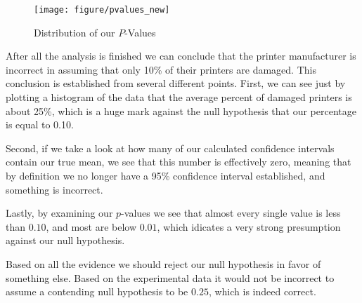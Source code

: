 \documentclass[10pt]{report}\usepackage[]{graphicx}\usepackage[]{xcolor}
\makeatletter
\def\maxwidth{ %
  \ifdim\Gin@nat@width>\linewidth
    \linewidth
  \else
    \Gin@nat@width
  \fi
}
\newenvironment{knitrout}{}{} %
\makeatother
\begin{document}
\begin{easylist}[enumerate]
\begin{knitrout}
\begin{figure}[H]
{\centering \texttt{[image: figure/pvalues\_new]} 

}

\caption[Distribution of our $P$-Values]{Distribution of our $P$-Values\label{fig:pvalues_new}}
\end{figure}


\end{knitrout}


        After all the analysis is finished we can conclude that the printer manufacturer is incorrect in assuming that
        only 10\% of their printers are damaged. This conclusion is established from several different points. First, we
        can see just by plotting a histogram of the data that the average percent of damaged printers is about 25\%,
        which is a huge mark against the null hypothesis that our percentage is equal to 0.10.\newline

        Second, if we take a look at how many of our calculated confidence intervals contain our true mean, we see that
        this number is effectively zero, meaning that by definition we no longer have a 95\% confidence interval
        established, and something is incorrect.\newline

        Lastly, by examining our $p$-values we see that almost every single value is less than $0.10$, and most are
        below $0.01$, which idicates a very strong presumption against our null hypothesis.\newline

        Based on all the evidence we should reject our null hypothesis in favor of something else. Based on the
        experimental data it would not be incorrect to assume a contending null hypothesis to be $0.25$, which is indeed
        correct.

    \end{easylist}
\end{document}

